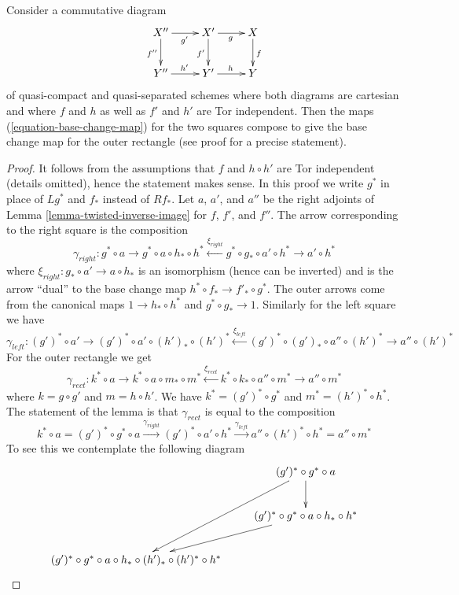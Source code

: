 \begin{lemma}
\label{lemma-compose-base-change-maps-horizontal}
Consider a commutative diagram
$$
\xymatrix{
X'' \ar[r]_{g'} \ar[d]_{f''} & X' \ar[r]_g \ar[d]_{f'} & X \ar[d]^f \\
Y'' \ar[r]^{h'} & Y' \ar[r]^h & Y
}
$$
of quasi-compact and quasi-separated schemes where
both diagrams are cartesian and where $f$ and $h$
as well as $f'$ and $h'$ are Tor independent.
Then the maps (\ref{equation-base-change-map})
for the two squares compose to give the base
change map for the outer rectangle (see proof for a precise statement).
\end{lemma}

\begin{proof}
It follows from the assumptions that $f$ and $h \circ h'$ are Tor
independent (details omitted), hence the statement makes sense.
In this proof we write $g^*$ in place of $Lg^*$ and $f_*$ instead
of $Rf_*$. Let $a$, $a'$, and $a''$ be the right adjoints of
Lemma \ref{lemma-twisted-inverse-image}
for $f$, $f'$, and $f''$. The arrow corresponding to the right
square is the composition
$$
\gamma_{right} :
g^* \circ a \to g^* \circ a \circ h_* \circ h^*
\xleftarrow{\xi_{right}} g^* \circ g_* \circ a' \circ h^* \to a' \circ h^*
$$
where $\xi_{right} : g_* \circ a' \to a \circ h_*$
is an isomorphism (hence can be inverted)
and is the arrow ``dual'' to the base change map
$h^* \circ f_* \to f'_* \circ g^*$. The outer arrows come
from the canonical maps $1 \to h_* \circ h^*$ and $g^* \circ g_* \to 1$.
Similarly for the left square we have
$$
\gamma_{left} :
(g')^* \circ a' \to (g')^* \circ a' \circ (h')_* \circ (h')^*
\xleftarrow{\xi_{left}}
(g')^* \circ (g')_* \circ a'' \circ (h')^* \to a'' \circ (h')^*
$$
For the outer rectangle we get
$$
\gamma_{rect} :
k^* \circ a \to
k^* \circ a \circ m_* \circ m^* \xleftarrow{\xi_{rect}}
k^* \circ k_* \circ a'' \circ m^* \to
a'' \circ m^*
$$
where $k = g \circ g'$ and $m = h \circ h'$.
We have $k^* = (g')^* \circ g^*$ and $m^* = (h')^* \circ h^*$.
The statement of the lemma is that $\gamma_{rect}$
is equal to the composition
$$
k^* \circ a =
(g')^* \circ g^* \circ a \xrightarrow{\gamma_{right}}
(g')^* \circ a' \circ h^* \xrightarrow{\gamma_{left}}
a'' \circ (h')^* \circ h^* = a'' \circ m^*
$$
To see this we contemplate the following diagram
$$
\xymatrix{
& (g')^* \circ g^* \circ a \ar[d] \ar[ddl] \\
& (g')^* \circ g^* \circ a \circ h_* \circ h^* \ar[ld] \\
(g')^* \circ g^* \circ a \circ h_* \circ (h')_* \circ (h')^* \circ h^* &
}$$
\end{proof}
